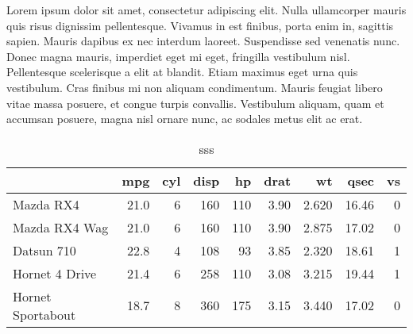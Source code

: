 \documentclass[]{article}
\newenvironment{Shaded}{\begin{snugshade}}{\end{snugshade}}
\newcommand{\KeywordTok}[1]{\textcolor[rgb]{0.13,0.29,0.53}{\textbf{{#1}}}}
\newcommand{\DataTypeTok}[1]{\textcolor[rgb]{0.13,0.29,0.53}{{#1}}}
\newcommand{\DecValTok}[1]{\textcolor[rgb]{0.00,0.00,0.81}{{#1}}}
\newcommand{\StringTok}[1]{\textcolor[rgb]{0.31,0.60,0.02}{{#1}}}
\newcommand{\NormalTok}[1]{{#1}}
\begin{document}
Lorem ipsum dolor sit amet, consectetur adipiscing elit. Nulla
ullamcorper mauris quis risus dignissim pellentesque. Vivamus in est
finibus, porta enim in, sagittis sapien. Mauris dapibus ex nec interdum
laoreet. Suspendisse sed venenatis nunc. Donec magna mauris, imperdiet
eget mi eget, fringilla vestibulum nisl. Pellentesque scelerisque a elit
at blandit. Etiam maximus eget urna quis vestibulum. Cras finibus mi non
aliquam condimentum. Mauris feugiat libero vitae massa posuere, et
congue turpis convallis. Vestibulum aliquam, quam et accumsan posuere,
magna nisl ornare nunc, ac sodales metus elit ac erat.

\begin{Shaded}
\end{Shaded}


\begin{wraptable}{l}{12.45cm}

\caption{\label{tab:unnamed-chunk-5}sss}
\centering
\fontsize{6}{8}\selectfont
\begin{tabular}[t]{l|r|r|r|r|r|r|r|r}
\hline
  & mpg & cyl & disp & hp & drat & wt & qsec & vs\\
\hline
Mazda RX4 & 21.0 & 6 & 160 & 110 & 3.90 & 2.620 & 16.46 & 0\\
\hline
Mazda RX4 Wag & 21.0 & 6 & 160 & 110 & 3.90 & 2.875 & 17.02 & 0\\
\hline
Datsun 710 & 22.8 & 4 & 108 & 93 & 3.85 & 2.320 & 18.61 & 1\\
\hline
Hornet 4 Drive & 21.4 & 6 & 258 & 110 & 3.08 & 3.215 & 19.44 & 1\\
\hline
Hornet Sportabout & 18.7 & 8 & 360 & 175 & 3.15 & 3.440 & 17.02 & 0\\
\hline
\end{tabular}
\end{wraptable}

\end{document}
